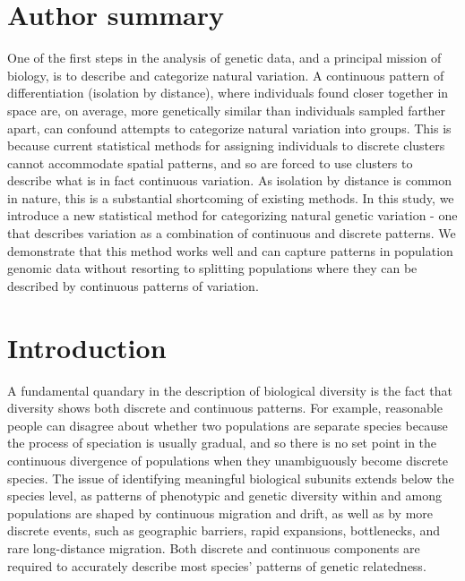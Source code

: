 \documentclass[10pt,letterpaper]{article}
\newif\ifsubmissionversion
\begin{document}
\ifsubmissionversion
\newpage
\fi


\section*{Author summary}
One of the first steps in the analysis of genetic data, 
and a principal mission of biology, 
is to describe and categorize natural variation. 
A continuous pattern of differentiation (isolation by distance), 
where individuals found closer together in space 
are, on average, more genetically similar than individuals sampled farther apart, 
can confound attempts to categorize natural variation into groups.  
This is because current statistical methods for assigning individuals to discrete clusters 
cannot accommodate spatial patterns, 
and so are forced to use clusters to describe what is in fact
continuous variation. 
As isolation by distance is common in nature, 
this is a substantial shortcoming of existing methods.
In this study, we introduce a new statistical method 
for categorizing natural genetic variation - 
one that describes variation as a combination of continuous and discrete patterns.
We demonstrate that this method works well and can capture patterns in
population genomic data without resorting to splitting populations
where they can be described by continuous patterns of variation.


\ifsubmissionversion
\linenumbers
\fi

\newpage
\section*{Introduction}
A fundamental quandary in the description of biological diversity is
the fact that diversity shows both discrete and continuous patterns. 
For example, reasonable people can disagree about whether two 
populations are separate species because the 
process of speciation is usually gradual, and so there is no set point
in the continuous divergence of populations when they unambiguously become discrete species.
The issue of identifying meaningful biological subunits 
extends below the species level, as patterns of phenotypic
and genetic diversity within and among populations are shaped
by continuous migration and drift, as well as by more discrete events, 
such as geographic barriers, rapid expansions, bottlenecks, and rare
long-distance migration. 
Both discrete and continuous components
are required to accurately describe most species' patterns of genetic relatedness.
\end{document}
